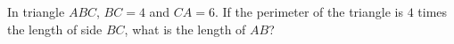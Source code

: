 In triangle $ABC$, $BC=4$ and $CA=6$. If the perimeter of the triangle is $4$ times the length of side $BC$, what is the length of $AB$?
